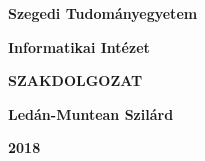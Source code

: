 \documentclass[12pt]{report}
\begin{document}
\thispagestyle{empty}

\begin{center}
{\Large\bf Szegedi Tudományegyetem}

\vspace{0.5cm}

{\Large\bf Informatikai Intézet}

\vspace*{8.5cm}


{\Huge\bf SZAKDOLGOZAT}


\vspace*{7cm}

{\LARGE\bf Ledán-Muntean Szilárd}

\vspace*{0.6cm}

{\Large\bf 2018}

\end{center}
\end{document}
